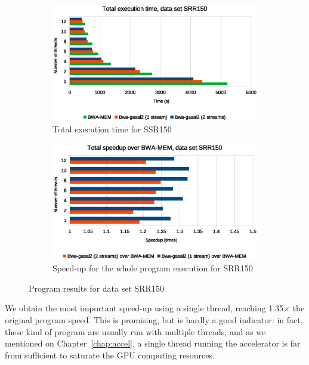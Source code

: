\begin{figure}[p]
	\centering
	\begin{subfigure}[t]{1\textwidth}
		\centering
			\includegraphics[width=1\textwidth]{srr150/total-exec-time-srr150}
		\caption{Total execution time for SSR150}
		\label{fig:total-exec-time-srr150}
	\end{subfigure}%
	
	\begin{subfigure}[b]{1\textwidth}
		\centering
		\includegraphics[width=1\textwidth]{srr150/total-exec-speed-up-srr150}
		\caption{Speed-up for the whole program execution for SRR150}
		\label{fig:total-exec-speed-up-srr150}
	\end{subfigure}
	\caption{Program results for data set SRR150}
\end{figure}

We obtain the most important speed-up using a single thread, reaching 1.35$\times$ the original program speed. This is promising, but is hardly a good indicator: in fact, these kind of program are usually run with multiple threads, and as we mentioned on Chapter~\ref{chap:accel}, a single thread running the accelerator is far from sufficient to saturate the GPU computing resources.

